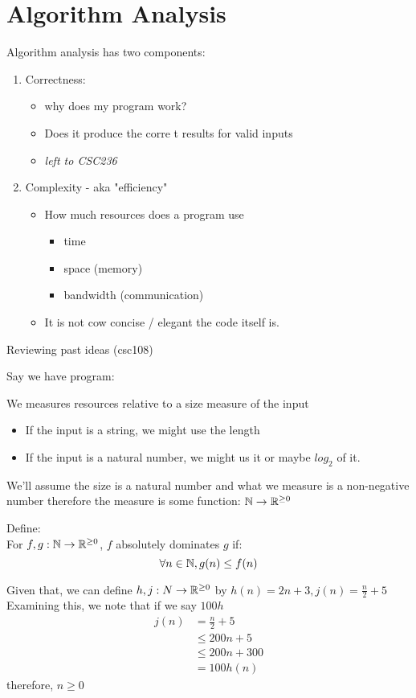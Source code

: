 \documentclass[12pt, letterpaper, twoside]{article}
\begin{document}
\section{Algorithm Analysis}
Algorithm analysis has two components:
\begin{enumerate}
    \item Correctness:
    \begin{itemize}
        \item why does my program work?
        \item Does it produce the corre t results for valid inputs
        \item \emph{left to CSC236}
    \end{itemize}
    \item Complexity - aka "efficiency" 
    \begin{itemize}
    
        \item How much resources does a program use
        \begin{itemize}
            \item time
            \item space (memory)
            \item bandwidth (communication)
        \end{itemize}
        \item It is not cow concise / elegant the code itself is. 
    \end{itemize}
\end{enumerate}
Reviewing past ideas (csc108)

Say we have program:

We measures resources relative to a size measure of the input
\begin{itemize}
    \item If the input is a string, we might use the length
    \item If the input is a natural number, we might us it or maybe $log_2$ of it.
\end{itemize}
We'll assume the size is a natural number and what we measure is a non-negative number 
therefore the measure is some function: $\mathbb N \to \mathbb R^{\ge 0}$

Define:\\
    For $f, g: \mathbb N \to \mathbb R^{\ge 0}$, $f$ absolutely dominates $g$ if:
    $$
        \forall n \in \mathbb N, g(n) \le f(n)
    $$

Given that, we can define $h, j: N \to \mathbb R^{\ge 0} $ by $h(n) = 2n + 3, j(n) = \frac{n}{2} + 5$
Examining this, we note that if we say $100h$
\begin{align*}
    j(n) &= \frac{n}{2} + 5\\
    &\le 200n + 5\\
    &\le 200n + 300\\
    &= 100h(n)
\end{align*}
therefore, $n \ge 0$
\end{document}
